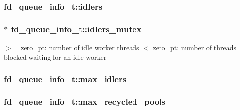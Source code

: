 \subsubsection[{\texorpdfstring{idlers}{idlers}}]{ fd\+\_\+queue\+\_\+info\+\_\+t\+::idlers}\hypertarget{structfd__queue__info__t_a34f88b2125fb629dd4200cf75568bb1d}{}\label{structfd__queue__info__t_a34f88b2125fb629dd4200cf75568bb1d}
\subsubsection[{\texorpdfstring{idlers\+\_\+mutex}{idlers_mutex}}]{ $\ast$ fd\+\_\+queue\+\_\+info\+\_\+t\+::idlers\+\_\+mutex}\hypertarget{structfd__queue__info__t_a18d58b9d46ec7629daee1c309161b8d0}{}\label{structfd__queue__info__t_a18d58b9d46ec7629daee1c309161b8d0}
$>$= zero\+\_\+pt\+: number of idle worker threads $<$ zero\+\_\+pt\+: number of threads blocked waiting for an idle worker 
\subsubsection[{\texorpdfstring{max\+\_\+idlers}{max_idlers}}]{ fd\+\_\+queue\+\_\+info\+\_\+t\+::max\+\_\+idlers}\hypertarget{structfd__queue__info__t_a288e8b082895e4560c6414d9b77b773d}{}\label{structfd__queue__info__t_a288e8b082895e4560c6414d9b77b773d}
\subsubsection[{\texorpdfstring{max\+\_\+recycled\+\_\+pools}{max_recycled_pools}}]{ fd\+\_\+queue\+\_\+info\+\_\+t\+::max\+\_\+recycled\+\_\+pools}\hypertarget{structfd__queue__info__t_ac83918a33f9efbcb3c79ca208358d5f3}{}\label{structfd__queue__info__t_ac83918a33f9efbcb3c79ca208358d5f3}
